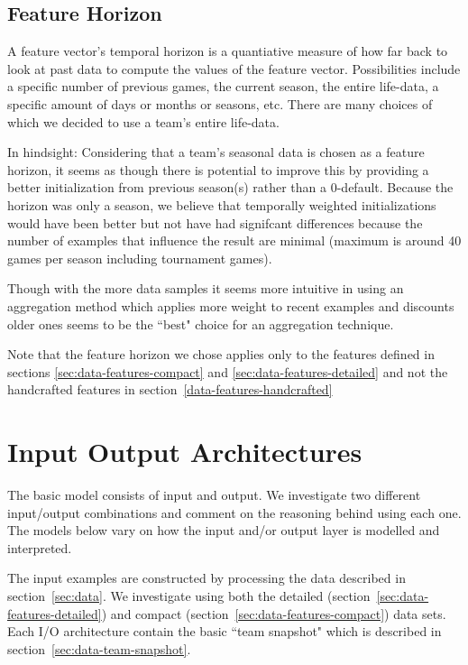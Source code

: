 \documentclass{article} %
\begin{document}
\subsection{Feature Horizon}
\label{sec:feature-horizon}

A feature vector's temporal horizon is a quantiative measure of how far back to look at past data to compute the values of the feature vector.
Possibilities include a specific number of previous games, the current season, the entire life-data, a specific amount of days or months or seasons, etc.
There are many choices of which we decided to use a team's entire life-data.

In hindsight: Considering that a team's seasonal data is chosen as a feature horizon, it seems as though there is potential to improve this by providing a better initialization from previous season(s) rather than a 0-default.
Because the horizon was only a season, we believe that temporally weighted initializations would have been better but not have had signifcant differences because the number of examples that influence the result are minimal (maximum is around 40 games per season including tournament games).

Though with the more data samples it seems more intuitive in using an aggregation method which applies more weight to recent examples and discounts older ones seems to be the ``best" choice for an aggregation technique.

Note that the feature horizon we chose applies only to the features defined in sections \ref{sec:data-features-compact} and \ref{sec:data-features-detailed} and not the handcrafted features in section~\ref{data-features-handcrafted}


\section{Input Output Architectures}
\label{sec:io-architectures}

The basic model consists of input and output.
We investigate two different input/output combinations and comment on the reasoning behind using each one.
The models below vary on how the input and/or output layer is modelled and interpreted.


The input examples are constructed by processing the data described in section~\ref{sec:data}.
We investigate using both the detailed (section~\ref{sec:data-features-detailed}) and compact (section~\ref{sec:data-features-compact}) data sets.
Each I/O architecture contain the basic ``team snapshot" which is described in section~\ref{sec:data-team-snapshot}.
\end{document}
